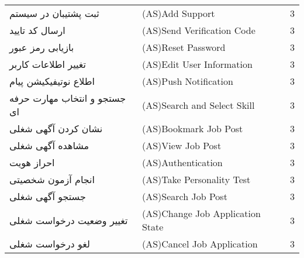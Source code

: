 \documentclass[12pt]{article}
\begin{document}
\begin{table}[]
\begin{tabular}{lll}
			ثبت پشتیبان در سیستم                 & (AS)Add Support                                                                                               & 3     \\
			ارسال کد تایید                       & (AS)Send Verification Code                                                                                    & 3     \\
			بازیابی رمز عبور‌‌                   & (AS)Reset Password                                                                                            & 3     \\
			تغییر اطلاعات کاربر                  & (AS)Edit User Information                                                                                     & 3     \\
			اطلاع نوتیفیکیشن پیام                & (AS)Push Notification                                                                                         & 3     \\
			جستجو و انتخاب مهارت حرفه ای         & (AS)Search and Select Skill                                                                                   & 3     \\
			نشان کردن آگهی شغلی                  & (AS)Bookmark Job Post                                                                                         & 3     \\
			مشاهده آگهی شغلی                     & (AS)View Job Post                                                                                             & 3     \\
			احراز هویت                           & (AS)Authentication                                                                                            & 3     \\
			انجام آزمون شخصیتی                   & (AS)Take Personality Test                                                                                     & 3     \\
			جستجو آگهی شغلی                      & (AS)Search Job Post                                                                                           & 3     \\
			تغییر وضعیت درخواست شغلی             & (AS)Change Job Application State                                                                              & 3     \\
			لغو درخواست شغلی                     & (AS)Cancel Job Application                                                                                    & 3     \\

\end{tabular}
\end{table}
\end{document}
